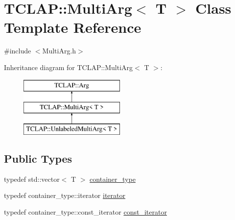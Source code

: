 \hypertarget{class_t_c_l_a_p_1_1_multi_arg}{}\section{T\+C\+L\+A\+P\+:\+:Multi\+Arg$<$ T $>$ Class Template Reference}
\label{class_t_c_l_a_p_1_1_multi_arg}


{\ttfamily \#include $<$Multi\+Arg.\+h$>$}

Inheritance diagram for T\+C\+L\+A\+P\+:\+:Multi\+Arg$<$ T $>$\+:\begin{figure}[H]
\begin{center}
\leavevmode
\includegraphics[height=3.000000cm]{class_t_c_l_a_p_1_1_multi_arg}
\end{center}
\end{figure}
\subsection*{Public Types}
\begin{DoxyCompactItemize}
\item 
typedef std\+::vector$<$ T $>$ \hyperlink{class_t_c_l_a_p_1_1_multi_arg_adae435f03fdde769bca57327487aab78}{container\+\_\+type}
\item 
typedef container\+\_\+type\+::iterator \hyperlink{class_t_c_l_a_p_1_1_multi_arg_a34196784baca2bd5aa079d639d49a7ca}{iterator}
\item 
typedef container\+\_\+type\+::const\+\_\+iterator \hyperlink{class_t_c_l_a_p_1_1_multi_arg_a3f8e9e8f5dcc7d3e6a518f42134cf64f}{const\+\_\+iterator}
\end{DoxyCompactItemize}
